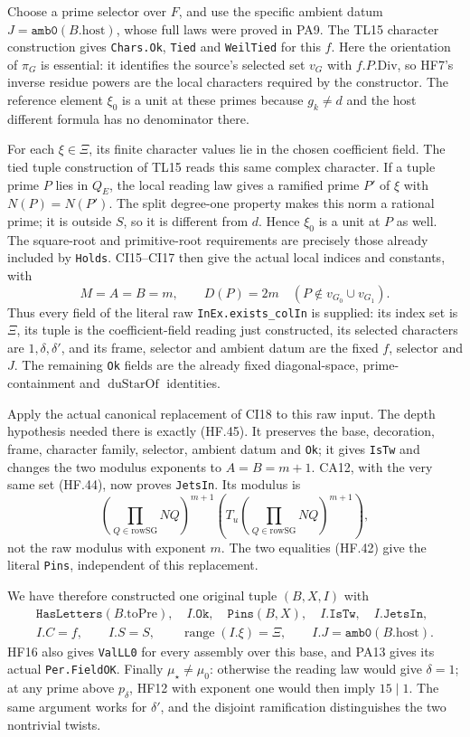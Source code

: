 Choose a prime selector over $F$, and use the
specific ambient datum $J=\texttt{amb0}(B.\mathrm{host})$,
whose full laws were proved in PA9. The TL15
character construction gives \texttt{Chars.Ok},
\texttt{Tied} and \texttt{WeilTied} for this $f$.
Here the orientation of $\pi_G$ is essential: it
identifies the source's selected set $v_G$ with
$f.P.\mathrm{Div}$, so HF7's inverse residue powers
are the local characters required by the constructor.
The reference element $\xi_0$ is a unit at these
primes because $g_k\ne d$ and the host different
formula has no denominator there.

For each $\xi\in\Xi$, its finite character values
lie in the chosen coefficient field. The tied
tuple construction of TL15 reads this same complex
character. If a tuple prime $P$ lies in $Q_E$,
the local reading law gives a ramified prime
$P'$ of $\xi$ with $N(P)=N(P')$. The split
degree-one property makes this norm a rational
prime; it is outside $S$, so it is different from
$d$. Hence $\xi_0$ is a unit at $P$ as well.
The square-root and primitive-root requirements
are precisely those already included by
\texttt{Holds}. CI15--CI17 then give the actual
local indices and constants, with
\[
 M=A=B=m,\qquad D(P)=2m
                  \quad(P\notin v_{G_0}\cup v_{G_1}). \tag{HF.45}
\]
Thus every field of the literal raw
\texttt{InEx.exists\_colIn} is supplied: its index
set is $\Xi$, its tuple is the coefficient-field
reading just constructed, its selected characters
are $1,\delta,\delta'$, and its frame, selector and
ambient datum are the fixed $f$, selector and $J$.
The remaining \texttt{Ok} fields are the already
fixed diagonal-space, prime-containment and
$\operatorname{duStarOf}$ identities.

Apply the actual canonical replacement of CI18
to this raw input. The depth hypothesis needed
there is exactly (HF.45). It preserves the base,
decoration, frame, character family, selector,
ambient datum and \texttt{Ok}; it gives
\texttt{IsTw} and changes the two modulus exponents
to $A=B=m+1$. CA12, with the very same set (HF.44),
now proves \texttt{JetsIn}. Its modulus is
\[
 \left(\prod_{Q\in\mathrm{rowSG}}NQ\right)^{m+1}
 \left(T_u\left(\prod_{Q\in\mathrm{rowSG}}NQ\right)^{m+1}\right),
 \tag{HF.46}
\]
not the raw modulus with exponent $m$.
The two equalities (HF.42) give the literal
\texttt{Pins}, independent of this replacement.

We have therefore constructed one original tuple
$(B,X,I)$ with
\[
 \begin{gathered}
 \texttt{HasLetters}(B.\mathrm{toPre}),\quad
 I.\texttt{Ok},\quad\texttt{Pins}(B,X),\quad
 I.\texttt{IsTw},\quad I.\texttt{JetsIn},\\
 I.C=f,\qquad I.S=S,\qquad
 \operatorname{range}(I.\xi)=\Xi,\qquad
 I.J=\texttt{amb0}(B.\mathrm{host}).                  \tag{HF.47}
 \end{gathered}
\]
HF16 also gives \texttt{ValLL0} for every assembly
over this base, and PA13 gives its actual
\texttt{Per.FieldOK}. Finally $\mu_\star\ne\mu_0$:
otherwise the reading law would give $\delta=1$;
at any prime above $p_\delta$, HF12 with exponent
one would then imply $15\mid1$. The same argument
works for $\delta'$, and the disjoint ramification
distinguishes the two nontrivial twists.

